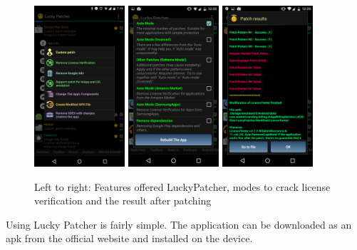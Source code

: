 \begin{figure}[h]
    \centering
    \includegraphics[width=0.3\textwidth]{data/luckyFeatures.png}
    \includegraphics[width=0.3\textwidth]{data/luckyModi.png}
    \includegraphics[width=0.3\textwidth]{data/luckyPatching.png}
    \caption{Left to right: Features offered LuckyPatcher, modes to crack license verification and the result after patching}
    \label{fig:luckyScreen}
\end{figure}
Using Lucky Patcher is fairly simple.
The application can be downloaded as an \gls{apk} from the official website \cite{luckyPatcherOfficial} and installed on the device.
